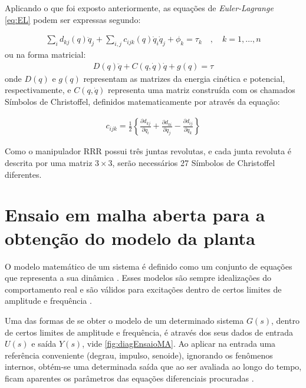 Aplicando o que foi exposto anteriormente, as equações de \textit{Euler-Lagrange} 
\eqref{eq:EL} podem ser expressas segundo:

\begin{equation}
  \begin{gathered}
    \sum_i d_{kj}(q)\ddot q_j + \sum_{i,j}c_{ijk}(q)\dot q_i\dot q_j + \phi_k = \tau_k \quad, \quad k=1,\dots,n
  \end{gathered}
  \label{eq:EL_Final}
\end{equation}
ou na forma matricial:
\begin{equation}
  \begin{gathered}
    D(q)\ddot q + C(q,\dot q)\dot q + g(q) = \tau
  \end{gathered}
  \label{eq:EL_FinalMat}
\end{equation}
onde $D(q)$ e $g(q)$ representam as matrizes da energia cinética e potencial, 
respectivamente, e $C(q,\dot q)$ representa uma matriz construída com os chamados
Símbolos de Christoffel, definidos matematicamente por  através
da equação:

\begin{equation}
  \begin{gathered}
    c_{ijk} = \frac{1}{2} \left\{ \frac{\partial d_{kj}}{\partial q_i}+\frac{\partial d_{ki}}{\partial q_j}-\frac{\partial d_{ij}}{\partial q_k} \right\}
  \end{gathered}
  \label{eq:christoffel}
\end{equation}

Como o manipulador RRR possui três juntas revolutas, e cada junta revoluta é descrita por uma matriz 
$3 \times 3$, serão necessários 27 Símbolos de Christoffel diferentes.

\section{Ensaio em malha aberta para a obtenção do modelo da planta}

O modelo matemático de um sistema é definido como um conjunto de equações que representa a sua dinâmica \cite{Ogata}. 
Esses modelos são sempre idealizações do comportamento
real e são válidos para excitações dentro de certos limites de amplitude e frequência \cite{Castrucci}.

Uma das formas de se obter o modelo de um determinado sistema $G(s)$, dentro de certos limites de amplitude e frequência,
é através dos seus dados de entrada $U(s)$ e saída $Y(s)$, vide \autoref{fig:diagEnsaioMA}. Ao aplicar na entrada uma 
referência conveniente (degrau, impulso, senoide), ignorando os fenômenos internos, obtém-se uma determinada saída que ao 
ser avaliada ao longo do tempo, ficam aparentes os parâmetros das equações diferenciais procuradas \cite{Castrucci}.

